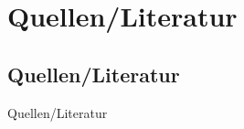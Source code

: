 \documentclass[mathserif,serif,german]{beamer}
\begin{document}
\section{Quellen/Literatur}
\subsection{Quellen/Literatur}

\begin{frame}{Quellen/Literatur}
	\small
	
	
\end{frame}


\end{document}
